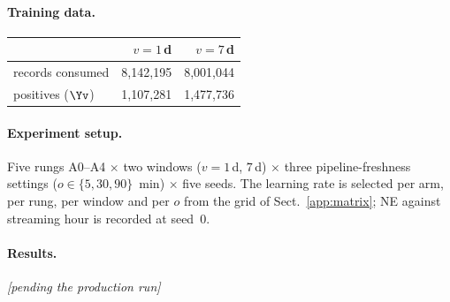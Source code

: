 \paragraph{Training data.}
\begin{center}\small\begin{tabular}{lrr}
\toprule
 & $v=1$\,d & $v=7$\,d\\
\midrule
records consumed & 8{,}142{,}195 & 8{,}001{,}044\\
positives ($\Yv$) & 1{,}107{,}281 & 1{,}477{,}736\\
\bottomrule
\end{tabular}\end{center}

\paragraph{Experiment setup.} Five rungs A0--A4 $\times$ two windows ($v=1$\,d, $7$\,d) $\times$ three pipeline-freshness settings ($o \in \{5, 30, 90\}$~min) $\times$ five seeds. The learning rate is selected per arm, per rung, per window and per $o$ from the grid of Sect.~\ref{app:matrix}; NE against streaming hour is recorded at seed~0.

\paragraph{Results.} \emph{[pending the production run]}


